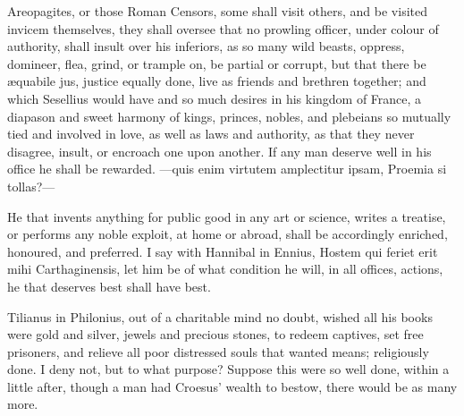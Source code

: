 {Areopagites, or those Roman Censors, some shall visit others, and
be visited invicem themselves,  they shall oversee that no
prowling officer, under colour of authority, shall insult over his
inferiors, as so many wild beasts, oppress, domineer, flea, grind, or
trample on, be partial or corrupt, but that there be \ae{}quabile jus,
justice equally done, live as friends and brethren together; and which
Sesellius would have and so much desires in his kingdom of France,
a diapason and sweet harmony of kings, princes, nobles, and plebeians
so mutually tied and involved in love, as well as laws and authority,
as that they never disagree, insult, or encroach one upon another. If
any man deserve well in his office he shall be rewarded.
---quis enim virtutem amplectitur ipsam,
Proemia si tollas?---

He that invents anything for public good in any art or science, writes
a treatise, or performs any noble exploit, at home or abroad,
 shall be accordingly enriched, honoured, and preferred. I
say with Hannibal in Ennius, Hostem qui feriet erit mihi
Carthaginensis, let him be of what condition he will, in all offices,
actions, he that deserves best shall have best.

Tilianus in Philonius, out of a charitable mind no doubt, wished all
his books were gold and silver, jewels and precious stones, to
redeem captives, set free prisoners, and relieve all poor distressed
souls that wanted means; religiously done. I deny not, but to what
purpose? Suppose this were so well done, within a little after, though
a man had Croesus' wealth to bestow, there would be as many more.

}
